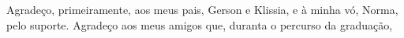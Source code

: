 

\begin{agradecimentos}
    Agradeço, primeiramente, aos meus pais, Gerson e Klissia, e à minha vó, Norma, pelo suporte. 
    Agradeço aos meus amigos que, duranta o percurso da graduação, 
\end{agradecimentos}
